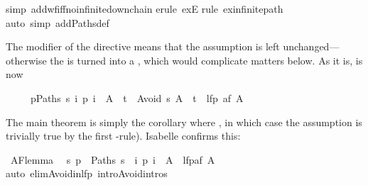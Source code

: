 \begin{isabellebody}
simp\ add{\isacharcolon}wf{\isacharunderscore}iff{\isacharunderscore}no{\isacharunderscore}infinite{\isacharunderscore}down{\isacharunderscore}chain{\isacharparenright}\isanewline
{}erule\ exE{\isacharparenright}\isanewline
{}rule\ ex{\isacharunderscore}infinite{\isacharunderscore}path{\isacharparenright}\isanewline
{}auto\ simp\ add{\isacharcolon}Paths{\isacharunderscore}def{\isacharparenright}\isanewline
{}%
\begin{isamarkuptext}%
The  modifier of the  directive means
that the assumption is left unchanged---otherwise the  is turned
into a , which would complicate matters below. As it is,
 is now
\begin{isabelle}%
\ \ \ \ \ {\isasymforall}p{\isasymin}Paths\ s{\isachardot}\ {\isasymexists}i{\isachardot}\ p\ i\ {\isasymin}\ A\ {\isasymLongrightarrow}\ t\ {\isasymin}\ Avoid\ s\ A\ {\isasymLongrightarrow}\ t\ {\isasymin}\ lfp\ {\isacharparenleft}af\ A{\isacharparenright}%
\end{isabelle}
The main theorem is simply the corollary where ,
in which case the assumption  is trivially true
by the first -rule). Isabelle confirms this:%
\end{isamarkuptext}%
\ AF{\isacharunderscore}lemma{}{\isacharcolon}\isanewline
\ \ {\isachardoublequote}{\isacharbraceleft}s{\isachardot}\ {\isasymforall}p\ {\isasymin}\ Paths\ s{\isachardot}\ {\isasymexists}\ i{\isachardot}\ p\ i\ {\isasymin}\ A{\isacharbraceright}\ {\isasymsubseteq}\ lfp{\isacharparenleft}af\ A{\isacharparenright}{\isachardoublequote}\isanewline
{}auto\ elim{\isacharcolon}Avoid{\isacharunderscore}in{\isacharunderscore}lfp\ intro{\isacharcolon}Avoid{\isachardot}intros{\isacharparenright}\isanewline
\isanewline
\end{isabellebody}%
